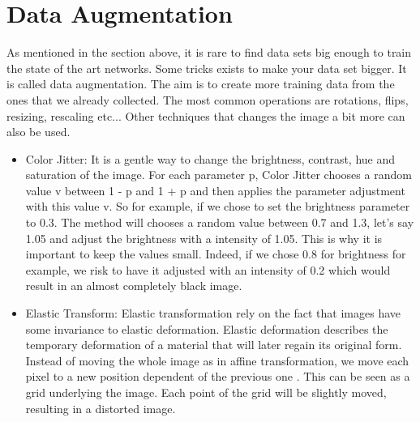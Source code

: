 \section{Data Augmentation} \label{sec:dataug}
As mentioned in the section above, it is rare to find data sets big enough to train the state of the art networks. Some tricks exists to make your data set bigger. It is called data augmentation. The aim is to create more training data from the ones that we already collected. The most common operations are rotations, flips, resizing, rescaling etc... Other techniques that changes the image a bit more can also be used.
\begin{itemize}
    \item Color Jitter: It is a gentle way to change the brightness, contrast, hue and saturation of the image. 
    For each parameter p, Color Jitter chooses a random value v between 1 - p and 1 + p and then applies the parameter adjustment with this value v. So for example, if we chose to set the brightness parameter to 0.3. The method will chooses a random value between 0.7 and 1.3, let's say 1.05 and adjust the brightness with a intensity of 1.05. This is why it is important to keep the values small. Indeed, if we chose 0.8 for brightness for example, we risk to have it adjusted with an intensity of 0.2 which would result in an almost completely black image.
     \item Elastic Transform:   Elastic transformation rely on the fact  that images have some invariance to elastic deformation. Elastic deformation describes the temporary deformation of a material that will later regain its original form. Instead of moving the whole image as in affine transformation, we move each pixel to a new position dependent of the previous one \cite{elastic}. This can be seen as a grid underlying the image. Each point of the grid will be slightly moved, resulting in a distorted image. 
     \end{itemize}